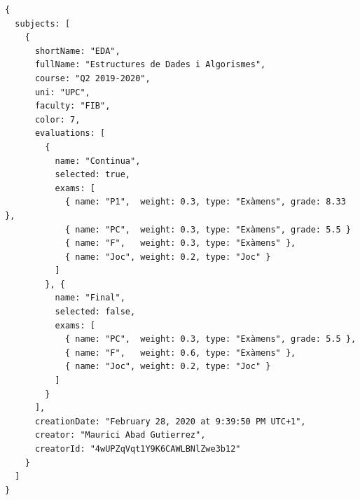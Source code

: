 \vfill
\begin{verbatim}
{
  subjects: [
    {
      shortName: "EDA",
      fullName: "Estructures de Dades i Algorismes",
      course: "Q2 2019-2020",
      uni: "UPC",
      faculty: "FIB",
      color: 7,
      evaluations: [
        {
          name: "Continua",
          selected: true,
          exams: [
            { name: "P1",  weight: 0.3, type: "Exàmens", grade: 8.33 },
            { name: "PC",  weight: 0.3, type: "Exàmens", grade: 5.5 }
            { name: "F",   weight: 0.3, type: "Exàmens" },
            { name: "Joc", weight: 0.2, type: "Joc" }
          ]
        }, {
          name: "Final",
          selected: false,
          exams: [
            { name: "PC",  weight: 0.3, type: "Exàmens", grade: 5.5 },
            { name: "F",   weight: 0.6, type: "Exàmens" },
            { name: "Joc", weight: 0.2, type: "Joc" }
          ]
        }
      ],
      creationDate: "February 28, 2020 at 9:39:50 PM UTC+1",
      creator: "Maurici Abad Gutierrez",
      creatorId: "4wUPZqVqt1Y9K6CAWLBNlZwe3b12"
    }
  ]
}
\end{verbatim}
\vfill
